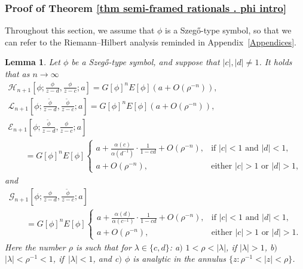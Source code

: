 \documentclass[pdftex]{sigma}
\numberwithin{equation}{section}
\newtheorem{Lemma}[Theorem]{Lemma}
 { \theoremstyle{definition}
\newtheorem{Definition}[Theorem]{Definition}
\newtheorem{Example}[Theorem]{Example}
\newtheorem{Remark}[Theorem]{Remark}
\newtheorem{Question}[Theorem]{Question}
}
\newcommand{\al}{\alpha}
\newcommand{\la}{\lambda}
\newcommand{\di}{\displaystyle}
\begin{document}
\subsubsection{Proof of Theorem \ref{thm semi-framed rationals . phi intro}}
		
		Throughout this section, we assume that $\phi$ is a Szeg\H{o}-type symbol, so that we can refer to the Riemann--Hilbert analysis reminded in Appendix~\ref{Appendices}.
		
		\begin{Lemma} Let $\phi$ be a Szeg\H{o}-type symbol, and suppose that $|c|, |d| \neq 1$. It holds that as $n \to \infty$
			\begin{gather}
				\mathscr{H}_{n+1}\left[\phi;\di \frac{\phi}{z-d}, \frac{\phi}{z-c} ;a\right] = G[\phi]^n E[\phi] (a + O(\rho^{-n})),\label{H phi . rational}
\\
				\mathscr{L}_{n+1}\left[\phi;\di \frac{\tilde{\phi}}{z-d}, \frac{\tilde{\phi}}{z-c} ;a\right] = G[\phi]^n E[\phi] (a + O(\rho^{-n})),\label{L phi . rational}
\\
				\mathscr{E}_{n+1}\left[\phi;\di \frac{\tilde{\phi}}{z-d}, \frac{\phi}{z-c} ;a\right] \nonumber\\
\qquad= G[\phi]^n E[\phi] \begin{cases}
					a+ \tfrac{\al(c)}{\al(d^{-1})}\cdot \tfrac{1}{1-cd}+O(\rho^{-n}), & \text{if $|c|<1$ and $|d|<1$}, \\
					a+O(\rho^{-n}), & \text{either $|c|>1$ or $|d|>1$},
				\end{cases}\label{E phi . rational}
			\end{gather}
			and
			\begin{gather}
				\mathscr{G}_{n+1}\left[\phi; \frac{\phi}{z-d}, \frac{\tilde{\phi}}{z-c} ;a\right]\nonumber\\
\qquad = G[\phi]^n E[\phi] \begin{cases}
					a+ \tfrac{\al(d)}{\al(c^{-1})}\cdot \tfrac{1}{1-cd}+O(\rho^{-n}), & \text{if $|c|<1$ and $|d|<1$}, \\
					a+O(\rho^{-n}), & \text{either $|c|>1$ or $|d|>1$}.
				\end{cases}\label{G phi . rational}
			\end{gather}
			Here the number $\rho$ is such that for $\la \in \{c,d\}$: a$)$ $1<\rho < |\la|$, if $|\la|>1$, b$)$ $|\la|<\rho^{-1}<1$, if~${|\la|<1}$, and c$)$ $\phi$ is analytic in the annulus $\big\{z\colon \rho^{-1}<|z|<\rho\big\}$.
		\end{Lemma}
\end{document}
